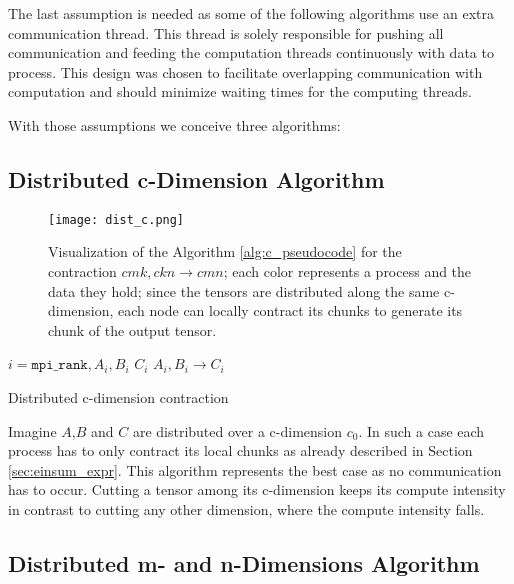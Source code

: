 The last assumption is needed as some of the following algorithms use an extra communication thread.
This thread is solely responsible for pushing all communication and feeding the computation threads continuously with data to process.
This design was chosen to facilitate overlapping communication with computation and should minimize waiting times for the computing threads.

With those assumptions we conceive three algorithms:

\subsection{Distributed c-Dimension Algorithm}

\begin{figure}[ht]
    \centering\texttt{[image: dist\_c.png]} 
    \caption{Visualization of the Algorithm \ref{alg:c_pseudocode} for the contraction $cmk,ckn \rightarrow cmn$; 
    each color represents a process and the data they hold; 
    since the tensors are distributed along the same c-dimension, each node can locally contract its chunks to generate its chunk of the output tensor.}
    \label{fig:c_algo}
    \end{figure}

\begin{algorithm}[ht]
    \begin{algorithmic}
    \Require $i = \texttt{mpi\_rank}, A_i, B_i$
    \Ensure $C_i$
    \State $A_i, B_i \rightarrow C_i$
\end{algorithmic}
\caption{Distributed c-dimension contraction}
\label{alg:c_pseudocode}
\end{algorithm}

Imagine $A$,$B$ and $C$ are distributed over a c-dimension $c_0$.
In such a case each process has to only contract its local chunks as already described in Section \ref{sec:einsum_expr}.
This algorithm represents the best case as no communication has to occur.
Cutting a tensor among its c-dimension keeps its compute intensity in contrast to cutting any other dimension, where the compute intensity falls.

\subsection{Distributed m- and n-Dimensions Algorithm}


